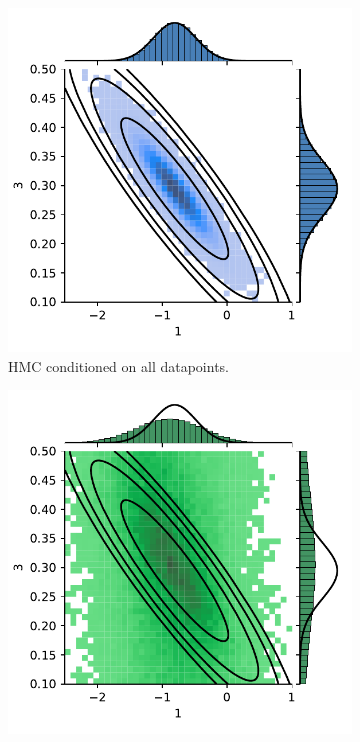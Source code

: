 \begin{figure}[htbp]
    \centering
    \begin{subfigure}[b]{0.4\textwidth}
        \centering
        \includegraphics[width=\textwidth]{Figures/simulated_joint_HMC_15.pdf} 
        \caption{HMC conditioned on all datapoints.}
    \end{subfigure}
    \begin{subfigure}[b]{0.4\textwidth}
        \centering
        \includegraphics[width=\textwidth]{Figures/simulated_joint_HMC_5.pdf} 

\end{subfigure}
\end{figure}
